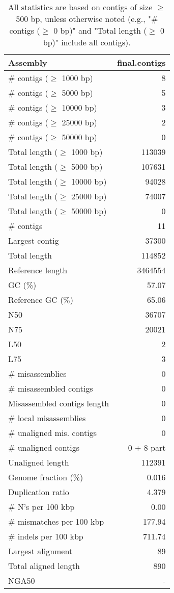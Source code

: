 \documentclass[12pt,a4paper]{article}
\begin{document}
\begin{table}[ht]
\begin{center}
\caption{All statistics are based on contigs of size $\geq$ 500 bp, unless otherwise noted (e.g., "\# contigs ($\geq$ 0 bp)" and "Total length ($\geq$ 0 bp)" include all contigs).}
\begin{tabular}{|l*{1}{|r}|}
\hline
Assembly & final.contigs \\ \hline
\# contigs ($\geq$ 1000 bp) & 8 \\ \hline
\# contigs ($\geq$ 5000 bp) & 5 \\ \hline
\# contigs ($\geq$ 10000 bp) & 3 \\ \hline
\# contigs ($\geq$ 25000 bp) & 2 \\ \hline
\# contigs ($\geq$ 50000 bp) & 0 \\ \hline
Total length ($\geq$ 1000 bp) & 113039 \\ \hline
Total length ($\geq$ 5000 bp) & 107631 \\ \hline
Total length ($\geq$ 10000 bp) & 94028 \\ \hline
Total length ($\geq$ 25000 bp) & 74007 \\ \hline
Total length ($\geq$ 50000 bp) & 0 \\ \hline
\# contigs & 11 \\ \hline
Largest contig & 37300 \\ \hline
Total length & 114852 \\ \hline
Reference length & 3464554 \\ \hline
GC (\%) & 57.07 \\ \hline
Reference GC (\%) & 65.06 \\ \hline
N50 & 36707 \\ \hline
N75 & 20021 \\ \hline
L50 & 2 \\ \hline
L75 & 3 \\ \hline
\# misassemblies & 0 \\ \hline
\# misassembled contigs & 0 \\ \hline
Misassembled contigs length & 0 \\ \hline
\# local misassemblies & 0 \\ \hline
\# unaligned mis. contigs & 0 \\ \hline
\# unaligned contigs & 0 + 8 part \\ \hline
Unaligned length & 112391 \\ \hline
Genome fraction (\%) & 0.016 \\ \hline
Duplication ratio & 4.379 \\ \hline
\# N's per 100 kbp & 0.00 \\ \hline
\# mismatches per 100 kbp & 177.94 \\ \hline
\# indels per 100 kbp & 711.74 \\ \hline
Largest alignment & 89 \\ \hline
Total aligned length & 890 \\ \hline
NGA50 & - \\ \hline
\end{tabular}
\end{center}
\end{table}
\end{document}
